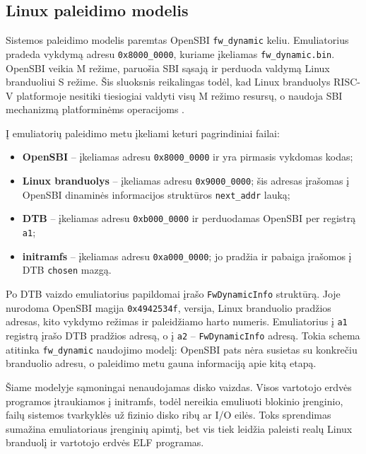 \subsection{Linux paleidimo modelis}
\label{sec:linux-paleidimo-modelis}

Sistemos paleidimo modelis paremtas OpenSBI \texttt{fw\_dynamic} keliu. Emuliatorius pradeda vykdymą adresu \texttt{0x8000\_0000}, kuriame įkeliamas \texttt{fw\_dynamic.bin}. OpenSBI veikia M režime, paruošia SBI sąsają ir perduoda valdymą Linux branduoliui S režime. Šis sluoksnis reikalingas todėl, kad Linux branduolys RISC-V platformoje nesitiki tiesiogiai valdyti visų M režimo resursų, o naudoja SBI mechanizmą platforminėms operacijoms \cite{riscv_sbi_spec}.

Į emuliatorių paleidimo metu įkeliami keturi pagrindiniai failai:

\begin{itemize}
    \item \textbf{OpenSBI} -- įkeliamas adresu \texttt{0x8000\_0000} ir yra pirmasis vykdomas kodas;
    \item \textbf{Linux branduolys} -- įkeliamas adresu \texttt{0x9000\_0000}; šis adresas įrašomas į OpenSBI dinaminės informacijos struktūros \texttt{next\_addr} lauką;
    \item \textbf{DTB} -- įkeliamas adresu \texttt{0xb000\_0000} ir perduodamas OpenSBI per registrą \texttt{a1};
    \item \textbf{initramfs} -- įkeliamas adresu \texttt{0xa000\_0000}; jo pradžia ir pabaiga įrašomos į DTB \texttt{chosen} mazgą.
\end{itemize}

Po DTB vaizdo emuliatorius papildomai įrašo \texttt{FwDynamicInfo} struktūrą. Joje nurodoma OpenSBI magija \texttt{0x4942534f}, versija, Linux branduolio pradžios adresas, kito vykdymo režimas ir paleidžiamo harto numeris. Emuliatorius į \texttt{a1} registrą įrašo DTB pradžios adresą, o į \texttt{a2} -- \texttt{FwDynamicInfo} adresą. Tokia schema atitinka \texttt{fw\_dynamic} naudojimo modelį: OpenSBI pats nėra susietas su konkrečiu branduolio adresu, o paleidimo metu gauna informaciją apie kitą etapą.

Šiame modelyje sąmoningai nenaudojamas disko vaizdas. Visos vartotojo erdvės programos įtraukiamos į initramfs, todėl nereikia emuliuoti blokinio įrenginio, failų sistemos tvarkyklės už fizinio disko ribų ar I/O eilės. Toks sprendimas sumažina emuliatoriaus įrenginių apimtį, bet vis tiek leidžia paleisti realų Linux branduolį ir vartotojo erdvės ELF programas.

